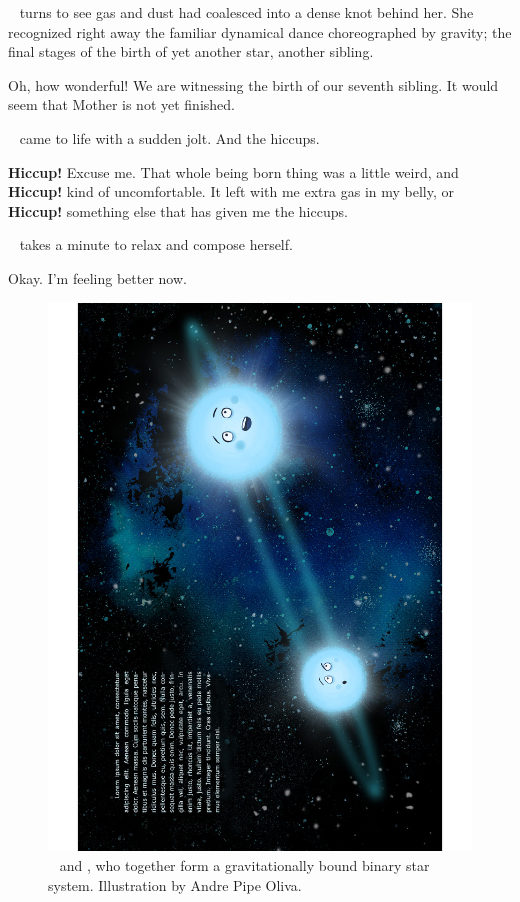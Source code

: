\documentclass[main.tex]{subfiles}
\begin{document}
\par \nar \rmmaia~ turns to see gas and dust had coalesced into a dense knot behind her.  She recognized right away the familiar dynamical dance choreographed by gravity; the final stages of the birth of yet another star, another sibling.

\par \Maia Oh, how wonderful!  We are witnessing the birth of our seventh sibling.  It would seem that Mother is not yet finished.

\par \nar \rmmerope~ came to life with a sudden jolt.  And the hiccups.  

\par \Merope \textbf{Hiccup!}  Excuse me.  That whole being born thing was a little weird, and \textbf{Hiccup!} kind of uncomfortable.  It left with me extra gas in my belly, or \textbf{Hiccup!} something else that has given me the hiccups.  

\par \nar \rmmerope~ takes a minute to relax and compose herself.

\par \Merope Okay.  I'm feeling better now.  

\begin{figure}
\includegraphics[width=\columnwidth,angle=270,origin=c]{ch1_1.pdf}
\caption{\rmmaia~ and \rmmerope, who together form a gravitationally bound binary star system.  Illustration by Andre Pipe Oliva.
\label{fig:fig1}}
\end{figure}
\end{document}
